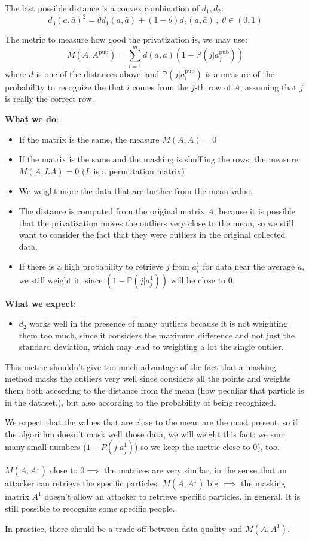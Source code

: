 \documentclass{article}
\renewcommand{\P}{\mathbb{P}}
\begin{document}
The last possible distance is a convex combination of $d_1, d_2$:
\begin{equation}
	d_3(a, \bar{a})^2 = \theta d_1(a, \bar{a}) + (1 - \theta) d_2(a, \bar{a}) \, , \; \theta \in (0, 1)
\end{equation}

The metric to measure how good the privatization is, we may use:
\begin{equation}
	M(A, A^\text{pub}) = \sum_{i=1}^{m} d(a, \bar{a}) \left(1 - \P(j| a_j^\text{pub}) \right)
\end{equation}
where $d$ is one of the distances above, and $\P(j | a_i^\text{pub})$ is a measure of the probability to recognize the that $i$ comes from the $j$-th row of $A$, assuming that $j$ is really the correct row. 

\textbf{What we do}:
\begin{itemize}
	\item If the matrix is the same, the measure $M(A, A) = 0$
	\item If the matrix is the same and the masking is shuffling the rows, the measure $M(A, LA) = 0$ ($L$ is a permutation matrix)
	\item We weight more the data that are further from the mean value.
	\item The distance is computed from the original matrix $A$, because it is possible that the privatization moves the outliers very close to the mean, so we still want to consider the fact that they were outliers in the original collected data.
	\item If there is a high probability to retrieve $j$ from $a_i^1$ for data near the average $\bar{a}$, we still weight it, since $(1 - \P(j| a_j^1) )$ will be close to $0$.
\end{itemize}
\textbf{What we expect}:
\begin{itemize}
	\item $d_2$ works well in the presence of many outliers because it is not weighting them too much, since it considers the maximum difference and not just the standard deviation, which may lead to weighting a lot the single outlier.
\end{itemize}

This metric shouldn't give too much advantage of the fact that a masking method masks the outliers very well since considers all the points and weights them both according to the distance from the mean (how peculiar that particle is in the dataset.), but also according to the probability of being recognized.

We expect that the values that are close to the mean are the most present, so if the algorithm doesn't mask well those data, we will weight this fact: we sum many small numbers ($1-P(j| a_j^1)$) so we keep the metric close to $0$), too.

$M(A,A^1)$ close to $0 \implies $ the matrices are very similar, in the sense that an attacker can retrieve the specific particles. $M(A,A^1)$ big $\implies$ the masking matrix $A^1$ doesn't allow an attacker to retrieve specific particles, in general. It is still possible to recognize some specific people.

In practice, there should be a trade off between data quality and $M(A,A^1)$.
\end{document}
